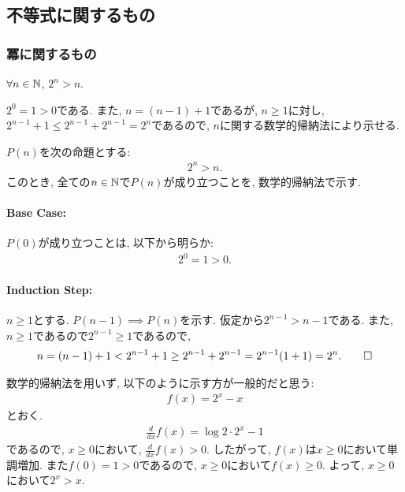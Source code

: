 \subsection{不等式に関するもの}
\subsubsection{冪に関するもの}
\begin{prop}
  \label{p:20230808}
  $\forall n\in\mathbb{N}$, $2^n> n$.
\end{prop}
\begin{proof**}
  $2^0=1> 0$である.
  また,
  $n=(n-1)+1$であるが,
  $n\geq 1$に対し,
  $2^{n-1}+1\leq  2^{n-1}+2^{n-1}=2^n$であるので,
  $n$に関する数学的帰納法により示せる.
\end{proof**}
\begin{proof*}
  $P(n)$を次の命題とする:
  \begin{align*}
    2^n>n
    .
  \end{align*}
  このとき,
  全ての$n\in\mathbb{N}$で$P(n)$が成り立つことを,
  数学的帰納法で示す.

  \paragraph{Base Case:}
  $P(0)$が成り立つことは, 以下から明らか:
  \begin{align*}
    2^0=1> 0.
  \end{align*}
  \paragraph{Induction Step:}
  $n\geq 1$とする.
  $P(n-1)\implies P(n)$を示す.
  仮定から$2^{n-1}>n-1$である.
  また, $n\geq 1$であるので$2^{n-1}\geq 1$であるので,
  \begin{align*}
    n=(n-1)+1<2^{n-1}+1\geq 2^{n-1}+2^{n-1}=2^{n-1}(1+1)=2^n
    .\qedhere
  \end{align*}
\end{proof*}

\begin{rem}
  数学的帰納法を用いず, 以下のように示す方が一般的だと思う:
  \begin{align*}
    f(x)=2^x-x
  \end{align*}
  とおく.
  \begin{align*}
    \frac{d}{dx}f(x)=\log 2 \cdot 2^x-1
  \end{align*}
  であるので, $x\geq 0$において, $\frac{d}{dx}f(x)> 0$.
  したがって, $f(x)$は$x\geq 0$において単調増加.
  また$f(0)=1>0$であるので,
  $x\geq 0$において$f(x)\geq 0$.
  よって, $x\geq 0$において$2^x>x$.
\end{rem}

